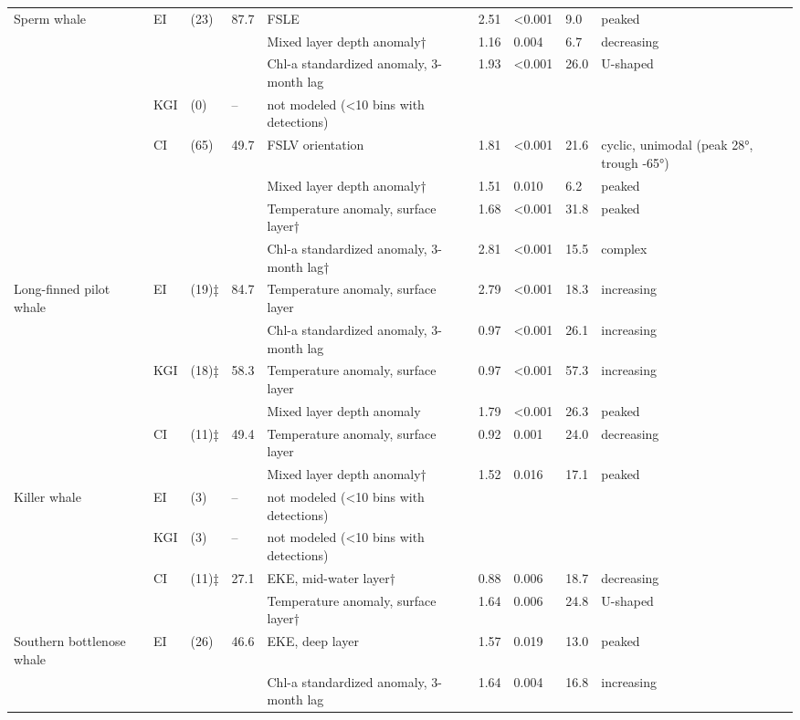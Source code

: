 \documentclass[
  11pt,
]{article}
\begin{document}
\begin{longtable}[t]{>{\raggedright\arraybackslash}p{1.9cm}l>{\raggedright\arraybackslash}p{1.3cm}l>{\raggedright\arraybackslash}p{3.6cm}lll>{\raggedright\arraybackslash}p{2.2cm}}
\endfoot
\bottomrule
\endlastfoot
Sperm whale & EI & 34 (23) & 87.7 & FSLE & 2.51 & <0.001 & 9.0 & peaked\\
 &  &  &  & Mixed layer depth anomaly† & 1.16 & 0.004 & 6.7 & decreasing\\
 &  &  &  & Chl-a standardized anomaly, 3-month lag & 1.93 & <0.001 & 26.0 & U-shaped\\
 & KGI & 89 (0) & -- & not modeled (<10 bins with detections) &  &  &  & \\
 & CI & 76 (65) & 49.7 & FSLV orientation & 1.81 & <0.001 & 21.6 & cyclic, unimodal (peak 28°, trough -65°)\\
 &  &  &  & Mixed layer depth anomaly† & 1.51 & 0.010 & 6.2 & peaked\\
 &  &  &  & Temperature anomaly, surface layer† & 1.68 & <0.001 & 31.8 & peaked\\
 &  &  &  & Chl-a standardized anomaly, 3-month lag† & 2.81 & <0.001 & 15.5 & complex\\
\midrule
Long-finned pilot whale & EI & 34 (19)‡ & 84.7 & Temperature anomaly, surface layer & 2.79 & <0.001 & 18.3 & increasing\\
 &  &  &  & Chl-a standardized anomaly, 3-month lag & 0.97 & <0.001 & 26.1 & increasing\\
 & KGI & 64 (18)‡ & 58.3 & Temperature anomaly, surface layer & 0.97 & <0.001 & 57.3 & increasing\\
 &  &  &  & Mixed layer depth anomaly & 1.79 & <0.001 & 26.3 & peaked\\
 & CI & 64 (11)‡ & 49.4 & Temperature anomaly, surface layer & 0.92 & 0.001 & 24.0 & decreasing\\
 &  &  &  & Mixed layer depth anomaly† & 1.52 & 0.016 & 17.1 & peaked\\
\midrule
Killer whale & EI & 68 (3) & -- & not modeled (<10 bins with detections) &  &  &  & \\
 & KGI & 177 (3) & -- & not modeled (<10 bins with detections) &  &  &  & \\
 & CI & 151 (11)‡ & 27.1 & EKE, mid-water layer† & 0.88 & 0.006 & 18.7 & decreasing\\
 &  &  &  & Temperature anomaly, surface layer† & 1.64 & 0.006 & 24.8 & U-shaped\\
\midrule
Southern bottlenose whale & EI & 34 (26) & 46.6 & EKE, deep layer & 1.57 & 0.019 & 13.0 & peaked\\
 &  &  &  & Chl-a standardized anomaly, 3-month lag & 1.64 & 0.004 & 16.8 & increasing\\

\end{longtable}
\end{document}

